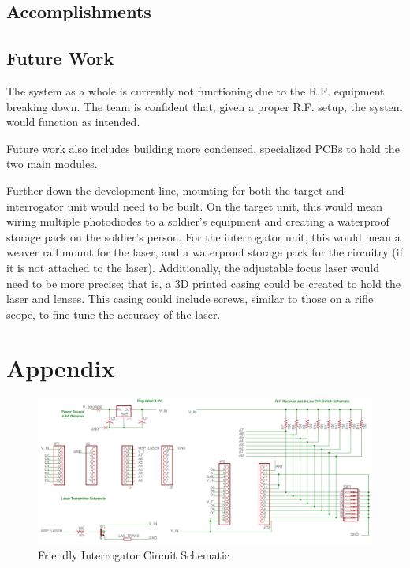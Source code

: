 \documentclass[letterpaper,10pt]{article}
\begin{document}
\begin{spacing}{1.15}
\subsection{Accomplishments}

\subsection{Future Work}

The system as a whole is currently not functioning due to the R.F. equipment breaking down. The team is confident that, given a proper R.F. setup, the system would function as intended. 

Future work also includes building more condensed, specialized PCBs to hold the two main modules. 

Further down the development line, mounting for both the target and interrogator unit would need to be built. On the target unit, this would mean wiring multiple photodiodes to a soldier's equipment and creating a waterproof storage pack on the soldier's person. For the interrogator unit, this would mean a weaver rail mount for the laser, and a waterproof storage pack for the circuitry (if it is not attached to the laser). Additionally, the adjustable focus laser would need to be more precise; that is, a 3D printed casing could be created to hold the laser and lenses. This casing could include screws, similar to those on a rifle scope, to fine tune the accuracy of the laser. 




\clearpage

\clearpage
\section*{Appendix}

\begin{figure} [H]
	\centering
	\includegraphics[scale=0.37]{friendly_interrogator_circuit.png}
	\caption{Friendly Interrogator Circuit Schematic \label{fig:interrogator-schematic}}
\end{figure}


\end{spacing}
\end{document}
